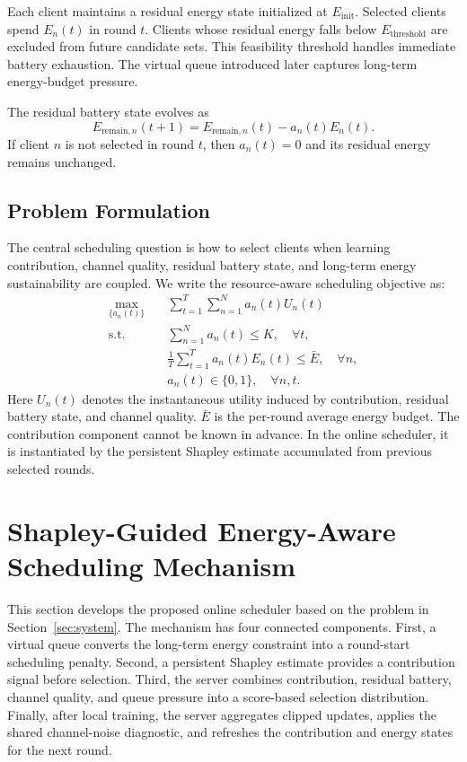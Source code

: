 \documentclass[journal]{IEEEtran}
\begin{document}
Each client maintains a residual energy state initialized at $E_{\text{init}}$. Selected clients spend $E_n(t)$ in round $t$. Clients whose residual energy falls below $E_{\text{threshold}}$ are excluded from future candidate sets. This feasibility threshold handles immediate battery exhaustion. The virtual queue introduced later captures long-term energy-budget pressure.

The residual battery state evolves as
\begin{equation}
E_{\text{remain},n}(t+1)=E_{\text{remain},n}(t)-a_n(t)E_n(t).
\end{equation}
If client $n$ is not selected in round $t$, then $a_n(t)=0$ and its residual energy remains unchanged.

\subsection{Problem Formulation}
\label{sec:problem}

The central scheduling question is how to select clients when learning contribution, channel quality, residual battery state, and long-term energy sustainability are coupled. We write the resource-aware scheduling objective as:
\begin{subequations}
\begin{align}
\max_{\{a_n(t)\}}\quad
&\sum_{t=1}^{T}\sum_{n=1}^{N}a_n(t)U_n(t)\\
\text{s.t.}\quad
&\sum_{n=1}^{N}a_n(t)\leq K,\quad \forall t,\\
&\frac{1}{T}\sum_{t=1}^{T}a_n(t)E_n(t)\leq \bar{E},\quad \forall n,\\
&a_n(t)\in\{0,1\},\quad \forall n,t.
\end{align}
\end{subequations}
Here $U_n(t)$ denotes the instantaneous utility induced by contribution, residual battery state, and channel quality. $\bar{E}$ is the per-round average energy budget. The contribution component cannot be known in advance. In the online scheduler, it is instantiated by the persistent Shapley estimate accumulated from previous selected rounds.

\section{Shapley-Guided Energy-Aware Scheduling Mechanism}
\label{sec:method}

This section develops the proposed online scheduler based on the problem in Section~\ref{sec:system}. The mechanism has four connected components. First, a virtual queue converts the long-term energy constraint into a round-start scheduling penalty. Second, a persistent Shapley estimate provides a contribution signal before selection. Third, the server combines contribution, residual battery, channel quality, and queue pressure into a score-based selection distribution. Finally, after local training, the server aggregates clipped updates, applies the shared channel-noise diagnostic, and refreshes the contribution and energy states for the next round.
\end{document}
